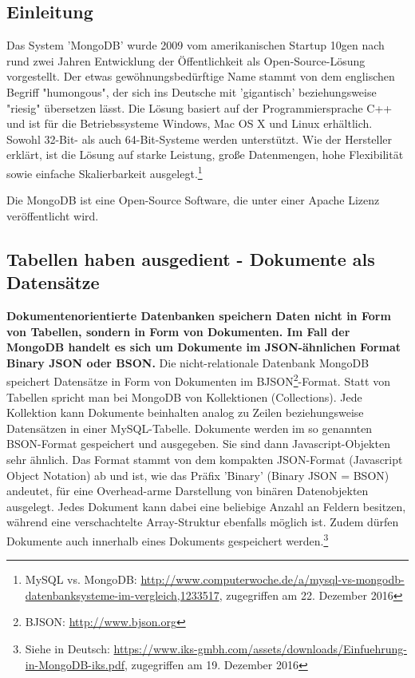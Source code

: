 \subsection{Einleitung}
Das System 'MongoDB' wurde 2009 vom amerikanischen Startup 10gen nach rund zwei Jahren Entwicklung der Öffentlichkeit als Open-Source-Lösung vorgestellt. Der etwas gewöhnungsbedürftige Name stammt von dem englischen Begriff "humongous", der sich ins Deutsche mit 'gigantisch'  beziehungsweise "riesig" übersetzen lässt. Die Lösung basiert auf der Programmiersprache C++ und ist für die Betriebssysteme Windows, Mac OS X und Linux erhältlich. Sowohl 32-Bit- als auch 64-Bit-Systeme werden unterstützt. Wie der Hersteller erklärt, ist die Lösung auf starke Leistung, große Datenmengen, hohe Flexibilität sowie einfache Skalierbarkeit ausgelegt.\footnote{MySQL vs. MongoDB: \url{http://www.computerwoche.de/a/mysql-vs-mongodb-datenbanksysteme-im-vergleich,1233517}, zugegriffen am 22. Dezember 2016}

Die MongoDB ist eine Open-Source Software, die unter einer Apache Lizenz veröffentlicht wird. 

\subsection{Tabellen haben ausgedient - Dokumente als Datensätze}
\textbf{ Dokumentenorientierte Datenbanken speichern Daten nicht in Form von Tabellen, sondern in Form von Dokumenten. Im Fall der MongoDB handelt es sich um Dokumente im JSON-ähnlichen Format Binary JSON oder BSON.}
Die nicht-relationale Datenbank MongoDB speichert Datensätze in Form von Dokumenten im BJSON\footnote{BJSON: \url{http://www.bjson.org}}-Format. Statt von Tabellen spricht man bei MongoDB von Kollektionen (Collections). Jede Kollektion kann Dokumente beinhalten analog zu Zeilen beziehungsweise Datensätzen in einer MySQL-Tabelle. Dokumente werden im so genannten BSON-Format gespeichert und ausgegeben. Sie sind dann Javascript-Objekten sehr ähnlich. Das Format stammt von dem kompakten JSON-Format (Javascript Object Notation) ab und ist, wie das Präfix 'Binary' (Binary JSON = BSON) andeutet, für eine Overhead-arme Darstellung von binären Datenobjekten ausgelegt. Jedes Dokument kann dabei eine beliebige Anzahl an Feldern besitzen, während eine verschachtelte Array-Struktur ebenfalls möglich ist. Zudem dürfen Dokumente auch innerhalb eines Dokuments gespeichert werden.\footnote{Siehe in Deutsch: \url{https://www.iks-gmbh.com/assets/downloads/Einfuehrung-in-MongoDB-iks.pdf}, zugegriffen am 19. Dezember 2016}


